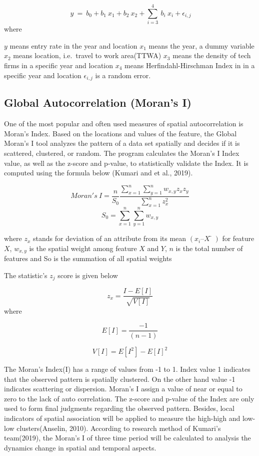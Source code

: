 \documentclass[
  12pt,
  oneside]{book}
\begin{document}
\[
\ y\ =\ b_0 + b_1 \ x_1 + b_2 \ x_2 + \sum_{i=3}^{4} \ b_i \ x_i + \epsilon_{i,j}
\]
where

\(y\) means entry rate in the year and location
\(x_1\) means the year, a dummy variable
\(x_2\) means location, i.e.~travel to work area(TTWA)
\(x_3\) means the density of tech firms in a specific year and location
\(x_4\) means Herfindahl-Hirschman Index in in a specific year and location
\(\epsilon_{i,j}\) is a random error.

\hypertarget{global-autocorrelation-morans-i}{%
\subsection{Global Autocorrelation (Moran's I)}\label{global-autocorrelation-morans-i}}

One of the most popular and often used measures of spatial autocorrelation is Moran's Index. Based on the locations and values of the feature, the Global Moran's I tool analyzes the pattern of a data set spatially and decides if it is scattered, clustered, or random. The program calculates the Moran's I Index value, as well as the z-score and p-value, to statistically validate the Index. It is computed using the formula below (Kumari and et al., 2019).

\[
Moran's \ I = \frac{n}{S_0} \frac{\sum_{x=1}^n \sum_{y=1}^n w_{x,y} z_x z_y}{\sum_{x=1}^n z_x^2}
\]
\[
S_0 = \sum_{x=1}^n \sum_{y=1}^n w_{x,y}
\]

where \(z_x\) stands for deviation of an attribute from its mean \((x_i – X̅)\) for feature \(X\), \(w_{x,y}\) is the spatial weight among feature \(X\) and \(Y\), \(n\) is the total number of features and So is the summation of all spatial weights

The statistic's \(z_j\) score is given below

\[ 
z_x = \frac{I - E[I]}{\sqrt{V[I]}}
\]
where

\[
E[I] = \frac{-1}{(n-1)}
\]

\[
V[I] = E[I^2]-E[I]^2
\]

The Moran's Index(I) has a range of values from -1 to 1. Index value 1 indicates that the observed pattern is spatially clustered. On the other hand value -1 indicates scattering or dispersion. Moran's I assign a value of near or equal to zero to the lack of auto correlation. The z-score and p-value of the Index are only used to form final judgments regarding the observed pattern. Besides, local indicators of spatial association will be applied to measure the high-high and low-low clusters(Anselin, 2010). According to research method of Kumari's team(2019), the Moran's I of three time period will be calculated to analysis the dynamics change in spatial and temporal aspects.
\end{document}
